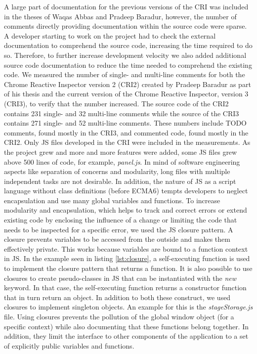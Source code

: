 A large part of documentation for the previous versions of the CRI was included in the theses of Waqas Abbas and Pradeep Baradur, however, the number of comments directly providing documentation within the source code were sparse. A developer starting to work on the project had to check the external documentation to comprehend the source code, increasing the time required to do so. Therefore, to further increase development velocity we also added additional source code documentation to reduce the time needed to comprehend the existing code. We measured the number of single- and multi-line comments for both the Chrome Reactive Inspector version 2 (CRI2) created by Pradeep Baradur as part of his thesis and the current version of the Chrome Reactive Inspector, version 3 (CRI3), to verify that the number increased. The source code of the CRI2 contains 231 single- and 32 multi-line comments while the source of the CRI3 contains 271 single- and 52 multi-line comments. These numbers include TODO comments, found mostly in the CRI3, and commented code, found mostly in the CRI2. Only JS files developed in the CRI were included in the measurements. 
As the project grew and more and more features were added, some JS files grew above 500 lines of code, for example, \emph{panel.js}. In mind of software engineering aspects like separation of concerns and modularity, long files with multiple independent tasks are not desirable. In addition, the nature of JS as a script language without class definitions (before ECMA6) tempts developers to neglect encapsulation and use many global variables and functions. To increase modularity and encapsulation, which helps to track and correct errors or extend existing code by enclosing the influence of a change or limiting the code that needs to be inspected for a specific error, we used the JS closure pattern. A closure prevents variables to be accessed from the outside and makes them effectively private. This works because variables are bound to a function context in JS. In the example seen in listing \ref{lst:closure}, a self-executing function is used to implement the closure pattern that returns a function. It is also possible to use closures to create pseudo-classes in JS that can be instantiated with the \emph{new} keyword. In that case, the self-executing function returns a constructor function that in turn return an object. In addition to both these construct, we used closures to implement singleton objects. An example for this is the \emph{stageStorage.js} file. Using closures prevents the pollution of the global window object (for a specific context) while also documenting that these functions belong together. In addition, they limit the interface to other components of the application to a set of explicitly public variables and functions.
